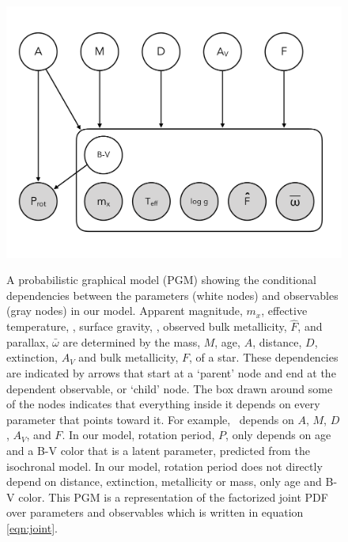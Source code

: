 \begin{figure}
  \caption{
A probabilistic graphical model (PGM) showing the conditional
dependencies between the parameters (white nodes) and
observables (gray nodes) in our model.
Apparent magnitude, $m_x$, effective temperature, \teff, surface gravity,
\logg, observed bulk metallicity, $\hat{F}$, and parallax, $\bar{\omega}$ are
determined by the mass, $M$, age, $A$, distance, $D$, extinction, $A_V$
and bulk metallicity, $F$, of a star.
These dependencies are indicated by arrows that start at a `parent' node
and end at the dependent observable, or `child' node.
The box drawn around some of the nodes indicates that everything inside it
depends on every parameter that points toward it.
For example, \logg\ depends on $A$, $M$, $D$, $A_V$, and $F$.
In our model, rotation period, $P$, only depends on age and a
B-V color that is a latent parameter, predicted from the isochronal model.
In our model, rotation period does not directly depend on distance,
extinction, metallicity or mass, only age and B-V color.
This PGM is a representation of the factorized joint PDF over parameters and
observables which is written in equation \ref{eqn:joint}.
}
  \centering
    \includegraphics[width=.7\textwidth]{PGM}
\label{fig:PGM}
\end{figure}

